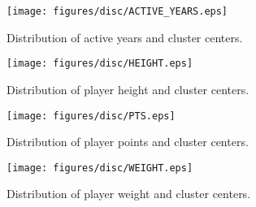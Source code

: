 \documentclass{article}
\begin{document}
\begin{figure}[h]
    \centering
    \texttt{[image: figures/disc/ACTIVE\_YEARS.eps]}
    \caption{Distribution of active years and cluster centers.}
\end{figure}
\begin{figure}[h]
    \centering
    \texttt{[image: figures/disc/HEIGHT.eps]}
    \caption{Distribution of player height and cluster centers.}
\end{figure}
\begin{figure}[h]
    \centering
    \texttt{[image: figures/disc/PTS.eps]}
    \caption{Distribution of player points and cluster centers.}
\end{figure}
\begin{figure}[h]
    \centering
    \texttt{[image: figures/disc/WEIGHT.eps]}
    \caption{Distribution of player weight and cluster centers.}
\end{figure}
\end{document}
